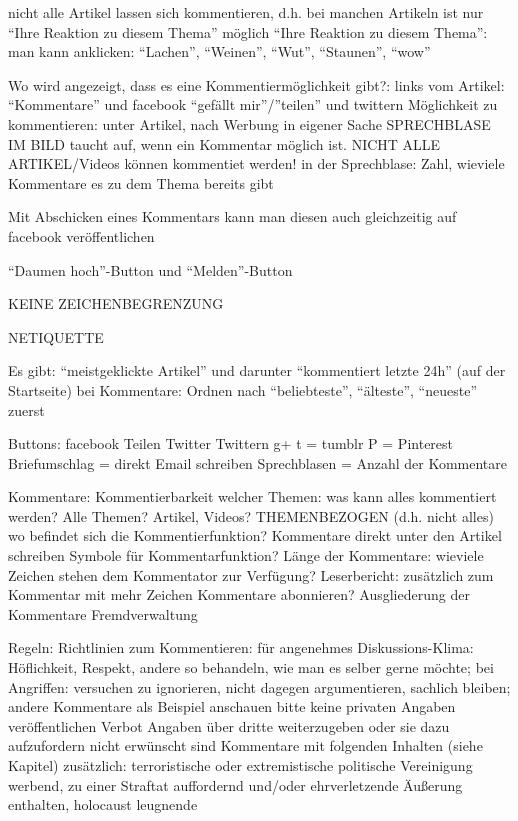 nicht alle Artikel lassen sich kommentieren, d.h. bei manchen Artikeln ist nur ``Ihre Reaktion zu diesem Thema'' möglich 
``Ihre Reaktion zu diesem Thema'': man kann anklicken: ``Lachen'', ``Weinen'', ``Wut'', ``Staunen'', ``wow''


Wo wird angezeigt, dass es eine Kommentiermöglichkeit gibt?: links vom Artikel: ``Kommentare'' und facebook ``gefällt mir''/''teilen'' und twittern 
Möglichkeit zu kommentieren: unter Artikel, nach Werbung in eigener Sache
SPRECHBLASE IM BILD taucht auf, wenn ein Kommentar möglich ist. NICHT ALLE ARTIKEL/Videos können kommentiet werden! 
in der Sprechblase: Zahl, wieviele Kommentare es zu dem Thema bereits gibt

Mit Abschicken eines Kommentars kann man diesen auch gleichzeitig auf facebook veröffentlichen

``Daumen hoch''-Button und ``Melden''-Button


KEINE ZEICHENBEGRENZUNG

NETIQUETTE

Es gibt: ``meistgeklickte Artikel'' und darunter ``kommentiert letzte 24h'' (auf der Startseite)
bei Kommentare: Ordnen nach ``beliebteste'', ``älteste'', ``neueste'' zuerst


Buttons:
facebook Teilen
Twitter Twittern
g+
t = tumblr
P = Pinterest
Briefumschlag = direkt Email schreiben
Sprechblasen = Anzahl der Kommentare


Kommentare:
	Kommentierbarkeit welcher Themen: was kann alles kommentiert werden? Alle Themen? Artikel, Videos? THEMENBEZOGEN (d.h. nicht alles)
	wo befindet sich die Kommentierfunktion? Kommentare direkt unter den Artikel schreiben
	Symbole für Kommentarfunktion?
	Länge der Kommentare: wieviele Zeichen stehen dem Kommentator zur Verfügung?
	Leserbericht: zusätzlich zum Kommentar mit mehr Zeichen
	Kommentare abonnieren?
	Ausgliederung der Kommentare
	Fremdverwaltung
	

Regeln: Richtlinien zum Kommentieren:
	für angenehmes Diskussions-Klima: Höflichkeit, Respekt, andere so behandeln, wie man es selber gerne möchte; bei Angriffen: versuchen zu ignorieren, nicht 			dagegen argumentieren, sachlich bleiben; andere Kommentare als Beispiel anschauen
	bitte keine privaten Angaben veröffentlichen
	Verbot Angaben über dritte weiterzugeben oder sie dazu aufzufordern
	nicht erwünscht sind Kommentare mit folgenden Inhalten (siehe Kapitel)
	zusätzlich: terroristische oder extremistische politische Vereinigung werbend, zu einer Straftat auffordernd und/oder ehrverletzende Äußerung enthalten, holocaust leugnende


